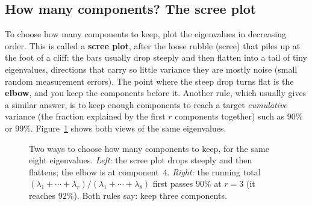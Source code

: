 \subsection{How many components? The scree plot}

To choose how many components to keep, plot the eigenvalues in decreasing order.
This is called a \textbf{scree plot}, after the loose rubble (scree) that piles up at
the foot of a cliff: the bars usually drop steeply and then flatten into a tail of
tiny eigenvalues, directions that carry so little variance they are mostly noise
(small random measurement errors). The point where the steep drop turns flat is the
\textbf{elbow}, and you keep the components before it. Another rule, which usually
gives a similar answer, is to keep enough components to reach a target
\emph{cumulative} variance (the fraction explained by the first $r$ components
together) such as $90\%$ or $99\%$. Figure~\ref{ch30:scree} shows both views of the
same eigenvalues.

\begin{figure}[H]
\centering
{}\hspace{0.4cm}%
\caption{Two ways to choose how many components to keep, for the same eight
eigenvalues. \emph{Left:} the scree plot drops steeply and then flattens; the elbow
is at component~4. \emph{Right:} the running total $(\lambda_1+\cdots+\lambda_r)/
(\lambda_1+\cdots+\lambda_8)$ first passes $90\%$ at $r=3$ (it reaches $92\%$). Both
rules say: keep three components.}
\label{ch30:scree}
\end{figure}

